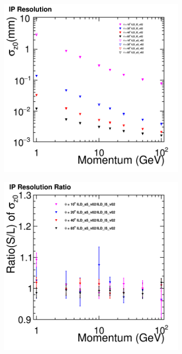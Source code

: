 \begin{figure}[htbp]
\begin{subfigure}{0.49\hsize}
 \caption{  \label{fig:perf:trk_d0cmp}}
 \end{subfigure}
\begin{subfigure}{0.49\hsize} 
 \includegraphics[width=\hsize]{Performance/fig/Z0Resolution_compare_v02-00-02_New_ILD_ls5_v02.png}
 \caption{ \label{fig:perf:trk_z0}}
 \end{subfigure}
\begin{subfigure}{0.49\hsize} 
 \includegraphics[width=\hsize]{Performance/fig/Z0Resolution_Ratio_v02-00-02_New_ILD_ls5_v02.png}

\end{subfigure}
\end{figure}
